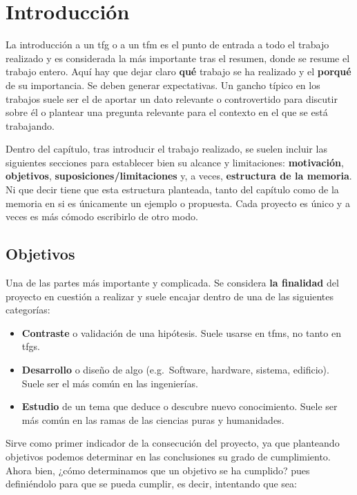 \chapter{Introducción}
\label{ch:introduccion}

La introducción a un \gls{tfg} o a un \gls{tfm} es el punto de entrada a todo el trabajo realizado y es considerada la más importante tras el resumen, donde se resume el trabajo entero. Aquí hay que dejar claro \textbf{qué} trabajo se ha realizado y el \textbf{porqué} de su importancia. Se deben generar expectativas. Un gancho típico en los trabajos suele ser el de aportar un dato relevante o controvertido para discutir sobre él o plantear una pregunta relevante para el contexto en el que se está trabajando.

Dentro del capítulo, tras introducir el trabajo realizado, se suelen incluir las siguientes secciones para establecer bien su alcance y limitaciones: \textbf{motivación}, \textbf{objetivos}, \textbf{suposiciones/limitaciones} y, a veces, \textbf{estructura de la memoria}. Ni que decir tiene que esta estructura planteada, tanto del capítulo como de la memoria en si es únicamente un ejemplo o propuesta. Cada proyecto es único y a veces es más cómodo escribirlo de otro modo.


\section{Objetivos}

Una de las partes más importante y complicada. Se considera \textbf{la finalidad} del proyecto en cuestión a realizar y suele encajar dentro de una de las siguientes categorías:

\begin{itemize}
    \item \textbf{Contraste} o validación de una hipótesis. Suele usarse en \glspl{tfm}, no tanto en \glspl{tfg}.
    \item \textbf{Desarrollo} o diseño de algo (e.g.~Software, hardware, sistema, edificio). Suele ser el más común en las ingenierías.
    \item \textbf{Estudio} de un tema que deduce o descubre nuevo conocimiento. Suele ser más común en las ramas de las ciencias puras y humanidades.
\end{itemize}

Sirve como primer indicador de la consecución del proyecto, ya que planteando objetivos podemos determinar en las conclusiones su grado de cumplimiento. Ahora bien, ¿cómo determinamos que un objetivo se ha cumplido? pues definiéndolo para que se pueda cumplir, es decir, intentando que sea:


